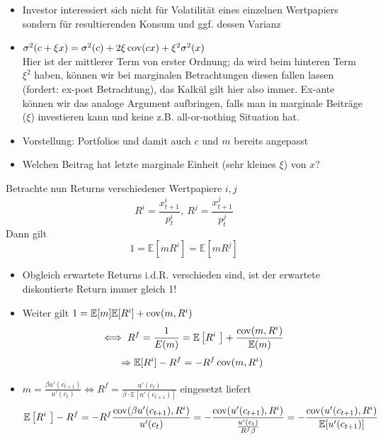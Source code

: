 \documentclass[12pt]{extreport} %
\theoremstyle{named}
\theoremstyle{nnamed}
\theoremstyle{itshape}
\theoremstyle{normal}
\begin{document}
\begin{itemize}
	\item Investor interessiert sich nicht für Volatilität eines einzelnen Wertpapiers sondern für resultierenden Konsum und ggf. dessen Varianz
	\item $\sigma^2(c + \xi x) = \sigma^2(c) + 2 \xi \operatorname{cov} (c x) + \xi^2 \sigma^2(x)$ ~\\
		Hier ist der mittlerer Term von erster Ordnung; da wird beim hinteren Term $\xi^2$ haben, können wir bei marginalen Betrachtungen diesen fallen lassen (fordert: ex-post Betrachtung), das Kalkül gilt hier also immer. Ex-ante können wir das analoge Argument aufbringen, falls man in marginale Beiträge ($\xi$) investieren kann und keine z.B. all-or-nothing Situation hat.
	\item Vorstellung: Portfolios und damit auch $c$ und $m$ bereits angepasst
	\item Welchen Beitrag hat letzte marginale Einheit (sehr kleines $\xi$) von $x$?
\end{itemize}

Betrachte nun Returns verschiedener Wertpapiere $i, j$
	$$ R^i = \frac{x_{t+1}^i}{p_t^i}, ~R^j = \frac{x_{t+1}^j}{p_t^j} $$
Dann gilt
$$ 1= \mathbb{E} \left[ m R^i \right] = \mathbb{E} \left[ m R^j \right] $$
\begin{itemize}
	\item Obgleich erwartete Returns i.d.R. verschieden sind, ist der erwartete diskontierte Return immer gleich 1!
	\item Weiter gilt $1 = \mathbb{E}[m] \mathbb{E}[R^i] + \operatorname{cov}(m, R^i)$
		$$ \iff R^f = \frac{1}{E(m)} = \mathbb{E} \left[R^i \right] + \frac{\cov(m, R^i)}{\mathbb{E}(m)} $$
		$$ \Rightarrow \mathbb{E}[R^i] - R^f = - R^f \operatorname{cov}(m,R^i) $$
	\item $m = \frac{\beta u'(c_{t+1})}{u'(c_t)} \iff R^f = \frac{u'(c_t)}{\beta \cdot \mathbb{E}\left[  u'(c_{t+1})\right]}$ eingesetzt liefert
		$$ \mathbb{E}\left[R^i \right] - R^f = - R^f \frac{ \cov(\beta u'(c_{t+1}),R^i)}{u'(c_t)} = -  \frac{ \cov( u'(c_{t+1}),R^i)}{\frac{u'(c_t)}{R^f \beta}} = -\frac{\cov(u'(c_{t+1}), R^i)}{\mathbb{E}[u'(c_{t+1})]} $$
\end{itemize}
\end{document}

